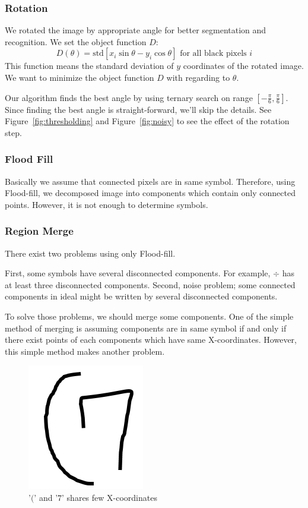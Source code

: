 \documentclass[10pt,twocolumn,letterpaper]{article}
\begin{document}
\subsubsection{Rotation}

We rotated the image by appropriate angle for better segmentation and recognition.
We set the object function $D$:
\begin{equation}
\label{eq:rotation-objective}
D(\theta) = \textrm{std}[x_i \sin{\theta} - y_i \cos{\theta}] \textrm{ for all black pixels } i
\end{equation}
This function means the standard deviation of $y$ coordinates of the rotated image.
We want to minimize the object function $D$ with regarding to $\theta$.

Our algorithm finds the best angle by using ternary search on range $[-\frac{\pi}{6}, \frac{\pi}{6}]$.
Since finding the best angle is straight-forward, we'll skip the details.
See Figure~\ref{fig:thresholding} and Figure~\ref{fig:noisy} to see the effect of the rotation step.



\subsubsection{Flood Fill}

Basically we assume that connected pixels are in same symbol. Therefore, using Flood-fill,
we decomposed image into components which contain only connected points.
However, it is not enough to determine symbols.

\subsubsection{Region Merge}

There exist two problems using only Flood-fill.

First, some symbols have several disconnected components. For example, $\div$ %
has at least three disconnected components.
Second, noise problem; some connected components in ideal might be written
by several disconnected components.

To solve those problems, we should merge some components. One of the simple method of merging
is assuming components are in same symbol if and only if there exist points of each components
which have same X-coordinates. However, this simple method makes another problem.

\begin{figure}[t]
    \begin{center}
        \includegraphics[width=0.1\linewidth]{img/little_overlapping.png}
    \end{center}
    \caption{'$($' and '$7$' shares few X-coordinates}
    \label{fig:little_overlapping}
\end{figure}
\end{document}
